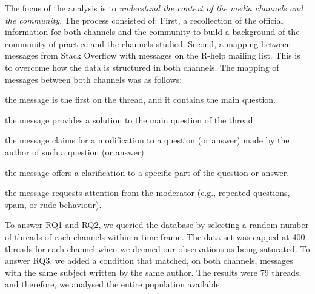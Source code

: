\documentclass{sig-alternate-05-2015}
\begin{document}
	The focus of the analysis is to \textit{understand the context of the media channels and the community}.
	The process consisted of:
	First, a recollection of the official information for both channels and the community to build a background of the community of practice and the channels studied.
	Second, a mapping between messages from Stack Overflow with messages on the R-help mailing list.
    This is to overcome how the data is structured in both channels.
    The mapping of messages between both channels was as follows:

	\begin{description}
      \setlength{\itemsep}{3pt}
      \setlength{\parskip}{0pt}
      \setlength{\parsep}{0pt}
		\item[Question:] the message is the first on the thread, and it contains the main question.
		\item[Answer:] the message provides a solution to the main question of the thread.
	 	\item[Update:] the message claims for a modification to a question (or answer) made by the author of such a question (or answer).
		\item[Comment:] the message offers a clarification to a specific part of the question or answer.
		\item[Flag:] the message requests attention from the moderator (e.g., repeated questions, spam, or rude behaviour).
	\end{description}

	To answer RQ1 and RQ2, we queried the database by selecting a random number of threads of each channels within a time frame.
	The data set was capped at 400 threads for each channel when we deemed our observations as being saturated.
	To answer RQ3, we added a condition that matched, on both channels, messages with the same subject written by the same author.
	The results were 79 threads, and therefore, we analysed the entire population available. 

\end{document}
